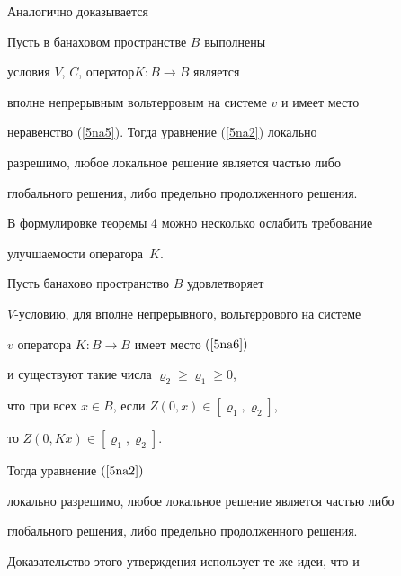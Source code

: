 Аналогично доказывается








\begin{cor}


Пусть в банаховом пространстве $B$ выполнены


условия $V$, $C$, оператор\linebreak $K:B \to B$ является


вполне непрерывным вольтерровым на системе $v$ и имеет место


неравенство (\ref{5na5}). Тогда уравнение (\ref{5na2}) локально


разрешимо, любое локальное решение является частью либо


глобального решения, либо предельно продолженного решения.


\end{cor}





В формулировке теоремы 4 можно несколько ослабить требование


улучшаемости оператора~$K$.








\begin{thm}


Пусть банахово пространство $B$ удовлетворяет


$V$-условию, для вполне непрерывного, вольтеррового на системе


$v$ оператора $K:B \to B$ имеет место $(\ref{5na6})$


и существуют такие числа $\varrho_2\geqslant\varrho_1\geqslant0$,


что при всех $x\in B$, если $Z(0, x)\in[\varrho_1, \varrho_2]$,


то $Z(0,K x)\in[\varrho_1, \varrho_2]$.


Тогда уравнение $(\ref{5na2})$


локально разрешимо, любое локальное решение является частью либо


глобального решения, либо предельно продолженного решения.


\end{thm}





Доказательство этого утверждения использует те же идеи, что и


